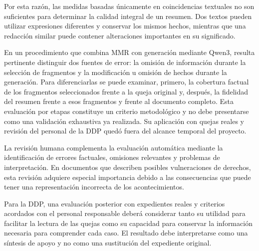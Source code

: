 Por esta razón, las medidas basadas únicamente en coincidencias textuales no son suficientes para determinar la calidad integral de un resumen. Dos textos pueden utilizar expresiones diferentes y conservar los mismos hechos, mientras que una redacción similar puede contener alteraciones importantes en su significado.

En un procedimiento que combina MMR con generación mediante Qwen3, resulta pertinente distinguir dos fuentes de error: la omisión de información durante la selección de fragmentos y la modificación u omisión de hechos durante la generación. Para diferenciarlas se puede examinar, primero, la cobertura factual de los fragmentos seleccionados frente a la queja original y, después, la fidelidad del resumen frente a esos fragmentos y frente al documento completo. Esta evaluación por etapas constituye un criterio metodológico y no debe presentarse como una validación exhaustiva ya realizada. Su aplicación con quejas reales y revisión del personal de la DDP quedó fuera del alcance temporal del proyecto.

La revisión humana complementa la evaluación automática mediante la identificación de errores factuales, omisiones relevantes y problemas de interpretación. En documentos que describen posibles vulneraciones de derechos, esta revisión adquiere especial importancia debido a las consecuencias que puede tener una representación incorrecta de los acontecimientos.

Para la DDP, una evaluación posterior con expedientes reales y criterios acordados con el personal responsable deberá considerar tanto su utilidad para facilitar la lectura de las quejas como su capacidad para conservar la información necesaria para comprender cada caso. El resultado debe interpretarse como una síntesis de apoyo y no como una sustitución del expediente original.